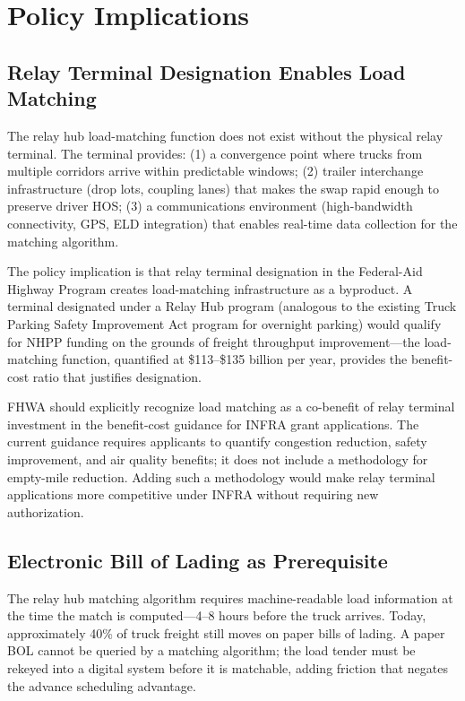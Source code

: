 \section{Policy Implications}
\label{sec:policy}

\subsection{Relay Terminal Designation Enables Load Matching}

The relay hub load-matching function does not exist without the physical relay terminal. The terminal provides: (1) a convergence point where trucks from multiple corridors arrive within predictable windows; (2) trailer interchange infrastructure (drop lots, coupling lanes) that makes the swap rapid enough to preserve driver HOS; (3) a communications environment (high-bandwidth connectivity, GPS, ELD integration) that enables real-time data collection for the matching algorithm.

The policy implication is that relay terminal designation in the Federal-Aid Highway Program creates load-matching infrastructure as a byproduct. A terminal designated under a Relay Hub program (analogous to the existing Truck Parking Safety Improvement Act program for overnight parking) would qualify for NHPP funding on the grounds of freight throughput improvement---the load-matching function, quantified at \$113--\$135 billion per year, provides the benefit-cost ratio that justifies designation.

FHWA should explicitly recognize load matching as a co-benefit of relay terminal investment in the benefit-cost guidance for INFRA grant applications. The current guidance requires applicants to quantify congestion reduction, safety improvement, and air quality benefits; it does not include a methodology for empty-mile reduction. Adding such a methodology would make relay terminal applications more competitive under INFRA without requiring new authorization.

\subsection{Electronic Bill of Lading as Prerequisite}

The relay hub matching algorithm requires machine-readable load information at the time the match is computed---4--8 hours before the truck arrives. Today, approximately 40\% of truck freight still moves on paper bills of lading. A paper BOL cannot be queried by a matching algorithm; the load tender must be rekeyed into a digital system before it is matchable, adding friction that negates the advance scheduling advantage.

